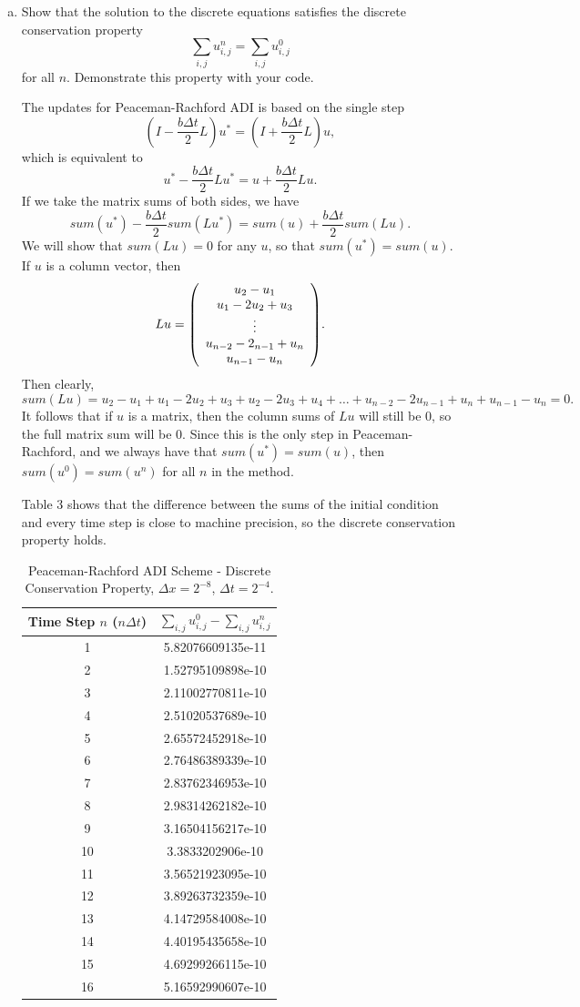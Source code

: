 \documentclass[12pt]{article}
\begin{document}
\begin{enumerate}[(a)]
\item  Show that the solution to the discrete equations satisfies the discrete conservation property
$$\sum_{i,j} u_{i,j}^n = \sum_{i,j} u^0_{i,j} $$
for all $n$. Demonstrate this property with your code.

The updates for Peaceman-Rachford ADI is based on the single step
$$(I-\dfrac{b\Delta t}{2}L)u^* = (I+\dfrac{b\Delta t}{2}L)u,$$
which is equivalent to
$$u^* - \dfrac{b\Delta t}{2} L u^* = u + \dfrac{b\Delta t}{2} L u.$$
If we take the matrix sums of both sides, we have
$$sum(u^*) - \dfrac{b\Delta t}{2} sum(Lu^*) = sum(u) + \dfrac{b\Delta t}{2} sum(Lu).$$
We will show that $sum(Lu)=0$ for any $u$, so that $sum(u^*)=sum(u)$.
If $u$ is a column vector, then
$$Lu = \qty(\begin{array}{c} u_2 - u_1 \\ u_1 - 2u_2 + u_3 \\ \vdots \\ u_{n-2}-2_{n-1}+u_n \\ u_{n-1} - u_n \end{array}).$$
Then clearly, 
$$sum(Lu) = u_2 - u_1 + u_1 - 2u_2 + u_3 + u_2 - 2u_3 + u_4 + \dots + u_{n-2} -2u_{n-1} + u_n + u_{n-1} - u_n = 0.$$
It follows that if $u$ is a matrix, then the column sums of $Lu$ will still be 0, so the full matrix sum will be 0.
Since this is the only step in Peaceman-Rachford, and we always have that $sum(u^*)=sum(u)$, then $sum(u^0) = sum(u^n)$ for all $n$ in the method.

Table 3 shows that the difference between the sums of the initial condition and every time step is close to machine precision, so the discrete conservation property holds.
\begin{table}[H]
\caption{Peaceman-Rachford ADI Scheme - Discrete Conservation Property, $\Delta x = 2^{-8}$, $\Delta t = 2^{-4}$.}
\centering\begin{tabular}{|cc|}
\hline \hline
Time Step $n$ ($n\Delta t$) & $\sum_{i,j} u_{i,j}^0 - \sum_{i,j} u^n_{i,j}$ \\
\hline  
1 & 5.82076609135e-11 \\
2 & 1.52795109898e-10 \\
3 & 2.11002770811e-10 \\
4 & 2.51020537689e-10 \\
5 & 2.65572452918e-10 \\
6 & 2.76486389339e-10 \\
7 & 2.83762346953e-10 \\
8 & 2.98314262182e-10 \\
9 & 3.16504156217e-10 \\
10 & 3.3833202906e-10 \\
11 & 3.56521923095e-10 \\
12 & 3.89263732359e-10 \\
13 & 4.14729584008e-10 \\
14 & 4.40195435658e-10 \\
15 & 4.69299266115e-10 \\
16 & 5.16592990607e-10 \\
\hline \hline
\end{tabular}
\end{table}


\end{enumerate}
\end{document}
